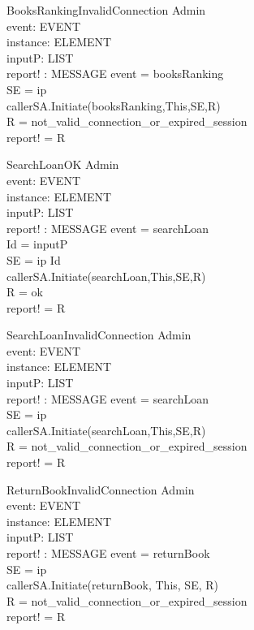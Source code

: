 \begin{schema}{BooksRankingInvalidConnection}
\Xi Admin \\
event: EVENT \\
instance: ELEMENT \\
inputP: LIST \\
report! : MESSAGE 
\where event = booksRanking \\
SE = \lseq ip \rseq \\
callerSA.Initiate(booksRanking,This,SE,R) \\
R = not\_valid\_connection\_or\_expired\_session \\ 
report! = R
\end{schema}


\begin{schema}{SearchLoanOK}
\Xi Admin \\
event: EVENT \\
instance: ELEMENT \\
inputP: LIST \\
report! : MESSAGE 
\where event = searchLoan \\
Id = \head inputP \\
SE = \lseq ip Id \rseq \\
callerSA.Initiate(searchLoan,This,SE,R)\\
R = ok \\
report! = R
\end{schema}


\begin{schema}{SearchLoanInvalidConnection}
\Xi Admin \\
event: EVENT \\
instance: ELEMENT \\
inputP: LIST \\
report! : MESSAGE 
\where event = searchLoan \\
SE = \lseq ip \rseq \\
callerSA.Initiate(searchLoan,This,SE,R) \\
R = not\_valid\_connection\_or\_expired\_session \\ 
report! = R
\end{schema}

\begin{schema} {ReturnBookInvalidConnection}
\Xi Admin \\
event: EVENT \\
instance: ELEMENT \\
inputP: LIST \\
report! : MESSAGE 
\where event = returnBook \\
SE = \lseq ip \rseq \\
callerSA.Initiate(returnBook, This, SE, R) \\
R = not\_valid\_connection\_or\_expired\_session \\
report! = R 
\end{schema}


